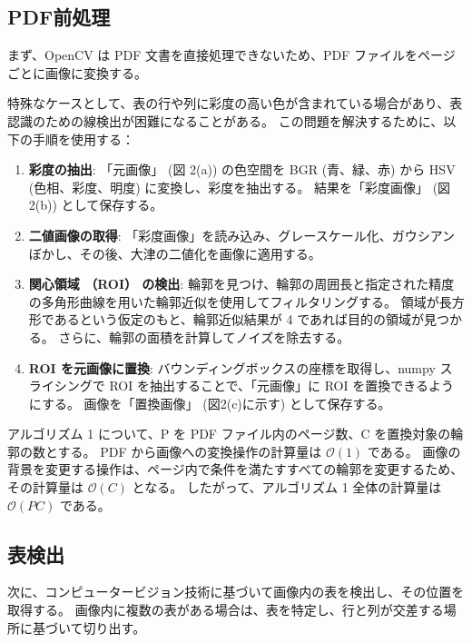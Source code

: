 \documentclass[uplatex, twocolumn,10pt]{jsarticle}
\begin{document}
\subsection{PDF前処理}
まず、OpenCV は PDF 文書を直接処理できないため、PDF ファイルをページごとに画像に変換する。

特殊なケースとして、表の行や列に彩度の高い色が含まれている場合があり、表認識のための線検出が困難になることがある。
この問題を解決するために、以下の手順を使用する：

\begin{enumerate}
    \item \textbf{彩度の抽出}:
    「元画像」 (図 2(a)) の色空間を BGR (青、緑、赤) から HSV (色相、彩度、明度) に変換し、彩度を抽出する。
    結果を「彩度画像」 (図2(b)) として保存する。
    \item \textbf{二値画像の取得}:
    「彩度画像」を読み込み、グレースケール化、ガウシアンぼかし、その後、大津の二値化を画像に適用する。
    \item \textbf{関心領域 （ROI） の検出}:
    輪郭を見つけ、輪郭の周囲長と指定された精度の多角形曲線を用いた輪郭近似を使用してフィルタリングする。
    領域が長方形であるという仮定のもと、輪郭近似結果が 4 であれば目的の領域が見つかる。
    さらに、輪郭の面積を計算してノイズを除去する。
    \item \textbf{ROI を元画像に置換}:
    バウンディングボックスの座標を取得し、numpy スライシングで ROI を抽出することで、「元画像」に ROI を置換できるようにする。
    画像を「置換画像」 (図2(c)に示す) として保存する。
\end{enumerate}


アルゴリズム 1 について、P を PDF ファイル内のページ数、C を置換対象の輪郭の数とする。
PDF から画像への変換操作の計算量は $\mathcal{O}(1)$ である。
画像の背景を変更する操作は、ページ内で条件を満たすすべての輪郭を変更するため、その計算量は $\mathcal{O}(C)$ となる。
したがって、アルゴリズム 1 全体の計算量は $\mathcal{O}(PC)$ である。

\subsection{表検出}
次に、コンピュータービジョン技術に基づいて画像内の表を検出し、その位置を取得する。
画像内に複数の表がある場合は、表を特定し、行と列が交差する場所に基づいて切り出す。
\end{document}
